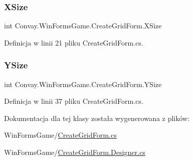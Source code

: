\subsubsection{\texorpdfstring{X\+Size}{XSize}}
{\footnotesize\ttfamily int Convay.\+Win\+Forms\+Game.\+Create\+Grid\+Form.\+X\+Size\hspace{0.3cm}{\ttfamily [get]}}



Definicja w linii 21 pliku Create\+Grid\+Form.\+cs.

\hypertarget{class_convay_1_1_win_forms_game_1_1_create_grid_form_aa4e0f8b3eaf92220006c3be2a24969c5}{}\label{class_convay_1_1_win_forms_game_1_1_create_grid_form_aa4e0f8b3eaf92220006c3be2a24969c5} 
\subsubsection{\texorpdfstring{Y\+Size}{YSize}}
{\footnotesize\ttfamily int Convay.\+Win\+Forms\+Game.\+Create\+Grid\+Form.\+Y\+Size\hspace{0.3cm}{\ttfamily [get]}}



Definicja w linii 37 pliku Create\+Grid\+Form.\+cs.



Dokumentacja dla tej klasy została wygenerowana z plików\+:\begin{DoxyCompactItemize}
\item 
Win\+Forms\+Game/\hyperlink{_create_grid_form_8cs}{Create\+Grid\+Form.\+cs}\item 
Win\+Forms\+Game/\hyperlink{_create_grid_form_8_designer_8cs}{Create\+Grid\+Form.\+Designer.\+cs}\end{DoxyCompactItemize}
